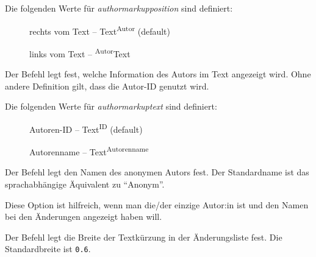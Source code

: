Die folgenden Werte für \emph{authormarkupposition} sind definiert:

\begin{description}
	\item [] rechts vom Text -- Text\textsuperscript{Autor} (default)
	\item [] links vom Text -- \textsuperscript{Autor}Text
\end{description}





Der Befehl  legt fest, welche Information des Autors im Text angezeigt wird.
Ohne andere Definition gilt, dass die Autor-ID genutzt wird.

Die folgenden Werte für \emph{authormarkuptext} sind definiert:

\begin{description}
	\item [] Autoren-ID -- Text\textsuperscript{ID} (default)
	\item [] Autorenname -- Text\textsuperscript{Autorenname}
\end{description}





Der Befehl  legt den Namen des anonymen Autors fest.
Der Standardname ist das sprachabhängige Äquivalent zu "`Anonym"'.

Diese Option ist \zB hilfreich, wenn man die/der einzige Autor:in ist und den Namen bei den Änderungen angezeigt haben will.






Der Befehl  legt die Breite der Textkürzung in der Änderungsliste fest.
Die Standardbreite ist \texttt{0.6}.





